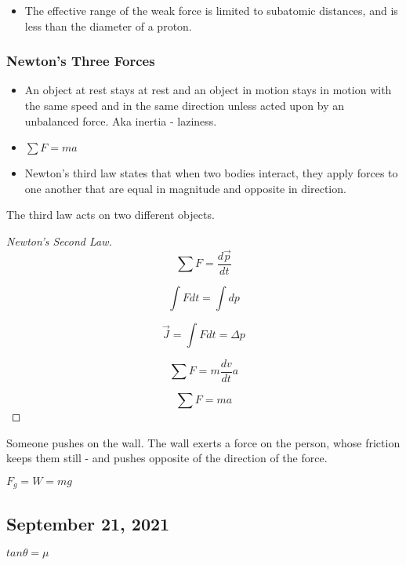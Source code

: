 \documentclass{scrreprt} %
\begin{document}
\begin{itemize}
	\item The effective range of the weak force is limited to subatomic
	distances, and is less than the diameter of a proton.
\end{itemize}

\subsubsection{Newton's Three Forces}

\begin{itemize}
	\item An object at rest stays at rest and an object in motion stays in
	motion with the same speed and in the same direction unless acted upon by an
	unbalanced force. Aka inertia - laziness.
	\item $\sum F = ma$
	\item Newton’s third law states that when two bodies interact, they apply
	forces to one another that are equal in magnitude and opposite in direction.
\end{itemize}

\begin{remark}
	The third law acts on two different objects.
\end{remark}

\begin{proof}[Newton's Second Law]
	
$$\sum F = \frac{d\vec{p}}{dt}$$

$$\int F dt = \int dp $$

$$\vec{J} = \int F dt = \Delta p$$

$$\sum F = m\frac{dv}{dt}a$$

$$\sum F = ma$$

\end{proof}


\begin{example}
Someone pushes on the wall. The wall exerts a force on the person, whose
friction keeps them still -  and pushes opposite of the direction of the
force.
\end{example}

$F_g = W = mg$

\subsection{September 21, 2021}

\begin{theorem}
	$tan\theta = \mu$
\end{theorem}
\end{document}
